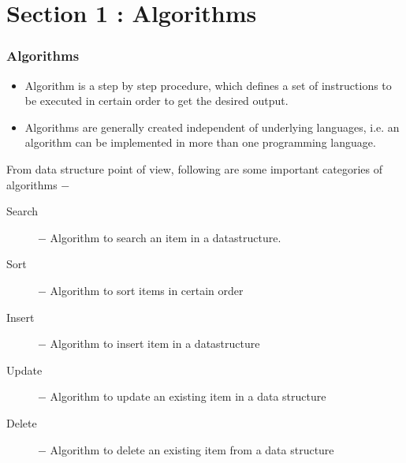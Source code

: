\documentclass{beamer}
\begin{document}

\section{Section 1 : Algorithms}
\begin{frame}
\frametitle{Algorithms}
\large
	\begin{itemize}
		\item Algorithm is a step by step procedure, which defines a set of instructions to be executed in certain order to get the desired output.
		\item Algorithms are generally created independent of underlying languages, i.e. an algorithm can be implemented in more than one programming language.
		 
	\end{itemize}

\end{frame}
\begin{frame}
From data structure point of view, following are some important categories of algorithms −

\begin{description}
	\item[Search] − Algorithm to search an item in a datastructure.
	\item[Sort] − Algorithm to sort items in certain order
	\item[Insert] − Algorithm to insert item in a datastructure
	\item[Update] − Algorithm to update an existing item in a data structure
	\item[Delete] − Algorithm to delete an existing item from a data structure
\end{description}

\end{frame}
\end{document}
